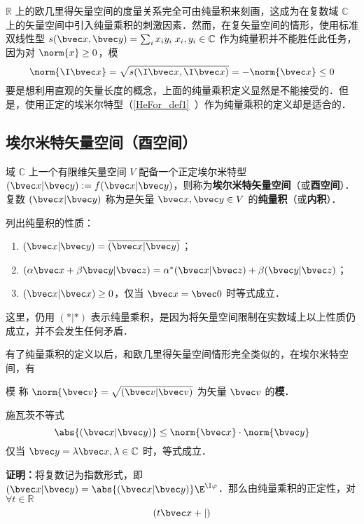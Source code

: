 
\begin{issues}
\issueTODO
\end{issues}

$\mathbb{R}$ 上的欧几里得矢量空间的度量关系完全可由纯量积来刻画，这成为在复数域 $\mathbb{C}$ 上的矢量空间中引入纯量乘积的刺激因素．然而，在复矢量空间的情形，使用标准双线性型 $s(\bvec x,\bvec y)=\sum_{i}x_iy_i\;x_i,y_i\in\mathbb{C}$ 作为纯量积并不能胜任此任务，因为对 $\norm{x}\geq0$，模
\begin{equation}
\norm{\I\bvec x}=\sqrt{s(\I\bvec x,\I\bvec x)}=-\norm{\bvec x}\leq0
\end{equation}
要是想利用直观的矢量长度的概念，上面的纯量乘积定义显然是不能接受的．但是，使用正定的埃米尔特型（\autoref{HeFor_def1}~）作为纯量乘积的定义却是适合的．
\subsection{埃尔米特矢量空间（酉空间）}
\begin{definition}{}
域 $\mathbb{C}$ 上一个有限维矢量空间 $V$ 配备一个正定埃尔米特型$(\bvec x|\bvec y):=f(\bvec x|\bvec y)$，则称为\textbf{埃尔米特矢量空间}（或\textbf{酉空间}）．复数 $(\bvec x|\bvec y)$ 称为是矢量 $\bvec x,\bvec y\in V$ 的\textbf{纯量积}（或\textbf{内积}）．
\end{definition}
列出纯量积的性质：
\begin{enumerate}
\item $(\bvec x|\bvec y)=\overline{(\bvec x|\bvec y)}$；
\item $(\alpha\bvec x+\beta\bvec y|\bvec z)=\alpha^*(\bvec x|\bvec z)+\beta(\bvec y|\bvec z)$；
\item $(\bvec x|\bvec x)\geq0$，仅当 $\bvec x=\bvec 0$ 时等式成立．
\end{enumerate}

这里，仍用 $(*|*)$ 表示纯量乘积，是因为将矢量空间限制在实数域上以上性质仍成立，并不会发生任何矛盾．

有了纯量乘积的定义以后，和欧几里得矢量空间情形完全类似的，在埃尔米特空间，有
\begin{definition}{模}
称 $\norm{\bvec v}=\sqrt{(\bvec v|\bvec v)}$ 为矢量 $\bvec v$ 的\textbf{模}．
\end{definition} 
\begin{theorem}{施瓦茨不等式}
\begin{equation}
\abs{(\bvec x|\bvec y)}\leq \norm{\bvec x}\cdot \norm{\bvec y}
\end{equation}
仅当 $\bvec y=\lambda\bvec x,\lambda\in\mathbb{C}$ 时，等式成立．
\end{theorem}
\textbf{证明：}将复数记为指数形式，即 $(\bvec x|\bvec y)=\abs{(\bvec x|\bvec y)}\E^{\I \varphi}$．那么由纯量乘积的正定性，对 $\forall t\in\mathbb{R}$
\begin{equation}
(t\bvec x+|)
\end{equation}
